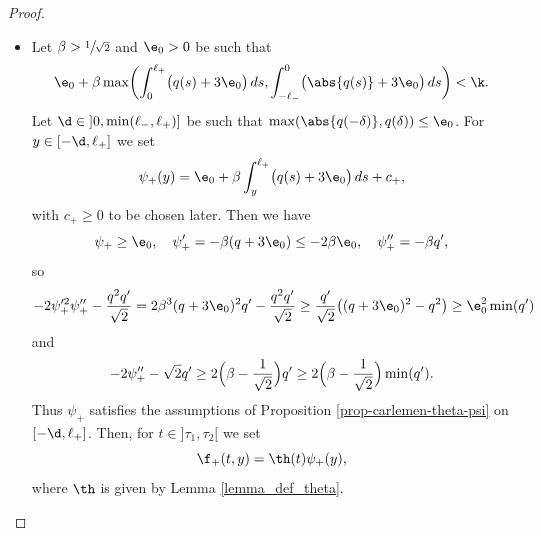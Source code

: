 \skpt
\begin{proof}
\begin{itemize}
\item
Let $\beta > \sfrac 1 {\sqrt 2}$ and $\e_0 > 0$ be such that
\begin{equation} \label{eq-eps-kappa}
\e_0 + \beta \max\biggl(\int_{0}^{\ell_+} \bigl(q(s) + 3 \e_0 \bigr) \, ds, \int_{-\ell_-}^0 \bigl(\abs{q(s)} + 3 \e_0 \bigr) \,ds \biggr) < \k.
\end{equation}
Let $\d \in{}]0,\min(\ell_-,\ell_+)]$ be such that $\max(\abs{q(-\delta)},q(\delta)) \leq \e_0$. For $y \in [-\d,\ell_+]$ we set
\[
\psi_+(y) = \e_0 + \beta \int_{y}^{\ell_+} \bigl(q(s)+3\e_0 \bigr) \, ds + c_+,
\]
with $c_+ \geq 0$ to be chosen later.
Then we have
\[
\psi_+ \geq \e_0, \quad \psi_+' = -\beta (q + 3 \e_0) \leq - 2 \beta \e_0, \quad \psi_+'' = - \beta q',
\]
so
\[
- 2 \psi_+'^2 \psi_+'' - \frac {q^2 q'}{\sqrt 2}
 = 2 \beta^3 (q+3\e_0)^2 q' - \frac {q^2 q'}{\sqrt 2}\geq \frac {q'}{\sqrt 2} \bigl((q+3\e_0)^2 - q^2 \bigr)\geq \e_0^2 \min(q')
\]
and
\[
- 2 \psi_+'' - \sqrt 2 q' \geq 2 \Bigl(\beta - \frac{1}{\sqrt 2}\Bigr) q' \geq 2 \Bigl(\beta - \frac{1}{\sqrt 2}\Bigr) \min(q').
\]
Thus $\psi_+$ satisfies the assumptions of Proposition \ref{prop-carlemen-theta-psi} on $[-\d,\ell_+]$.
Then, for $t \in{}]\tau_1,\tau_2[$ we set
\begin{equation} \label{def-phi-+}
\f_+(t,y) = \th(t) \psi_+(y),
\end{equation}
where $\th$ is given by Lemma \ref{lemma_def_theta}.


\end{itemize}
\end{proof}
